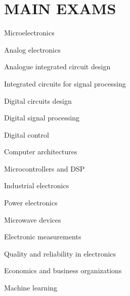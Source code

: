 \section*{MAIN EXAMS}
\begin{minipage}[t]{0.45\textwidth}
    \begin{description}[leftmargin=5mm]
        \item[-] Microelectronics
        \item[-] Analog electronics
        \item[-] Analogue integrated circuit design
        \item[-] Integrated circuits for signal processing
        \item[-] Digital circuits design
        \item[-] Digital signal processing
        \item[-] Digital control
        \item[-] Computer architectures 
    \end{description}
\end{minipage}
\hfill
\begin{minipage}[t]{0.45\textwidth}
    \begin{description}[leftmargin=5mm]
        \item[-] Microcontrollers and DSP
        \item[-] Industrial electronics 
        \item[-] Power electronics
        \item[-] Microwave devices
        \item[-] Electronic measurements
        \item[-] Quality and reliability in electronics
        \item[-] Economics and business organizations 
        \item[-] Machine learning
    \end{description}
\end{minipage}